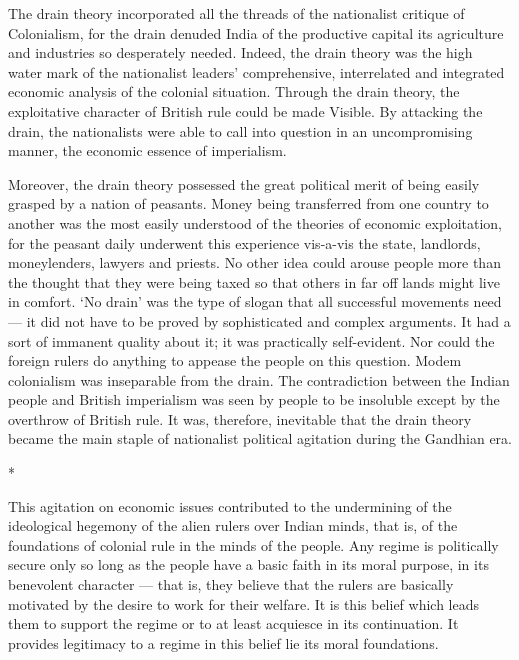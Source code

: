 The drain theory incorporated all the threads of the nationalist critique of Colonialism, for the drain denuded India of the productive capital its agriculture and industries so desperately needed. Indeed, the drain theory was the high water­ mark of the nationalist leaders’ comprehensive, interrelated and integrated economic analysis of the colonial situation. Through the drain theory, the exploitative character of British rule could be made Visible. By attacking the drain, the nationalists were able to call into question in an uncompromising manner, the economic essence of imperialism.

Moreover, the drain theory possessed the great political merit of being easily grasped by a nation of peasants. Money being transferred from one country to another was the most easily understood of the theories of economic exploitation, for the peasant daily underwent this experience vis-a-vis the state, landlords, moneylenders, lawyers and priests. No other idea could arouse people more than the thought that they were being taxed so that others in far off lands might live in comfort. ‘No drain’ was the type of slogan that all successful movements need — it did not have to be proved by sophisticated and complex arguments. It had a sort of immanent quality about it; it was practically self-evident. Nor could the foreign rulers do anything to appease the people on this question. Modem colonialism was inseparable from the drain. The contradiction between the Indian people and British imperialism was seen by people to be insoluble except by the overthrow of British rule. It was, therefore, inevitable that the drain theory became the main staple of nationalist political agitation during the Gandhian era.

\begin{center}*\end{center}



This agitation on economic issues contributed to the undermining of the ideological hegemony of the alien rulers over Indian minds, that is, of the foundations of colonial rule in the minds of the people. Any regime is politically secure only so long as the people have a basic faith in its moral purpose, in its benevolent character — that is, they believe that the rulers are basically motivated by the desire to work for their welfare. It is this belief which leads them to support the regime or to at least acquiesce in its continuation. It provides legitimacy to a regime in this belief lie its moral foundations.

